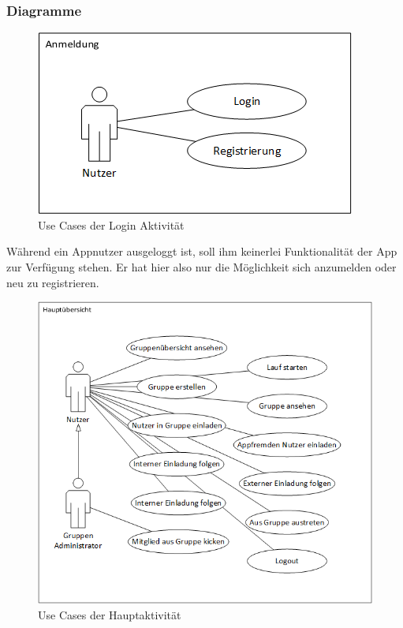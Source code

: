\subsubsection{Diagramme}
\begin {figure}[!hb]\label{fig:usecase_login}
\centering
\includegraphics[width=\textwidth]{abb/usecase_login}
\caption{Use Cases der Login Aktivität}
\end{figure}
Während ein Appnutzer ausgeloggt ist, soll ihm keinerlei Funktionalität der App zur Verfügung stehen. Er hat hier also nur die Möglichkeit sich anzumelden oder neu zu registrieren.
\begin {figure}[!hb]\label{fig:usecase_main}
\centering
\includegraphics[width=\textwidth]{abb/usecase_main}
\caption{Use Cases der Hauptaktivität}
\end{figure}
